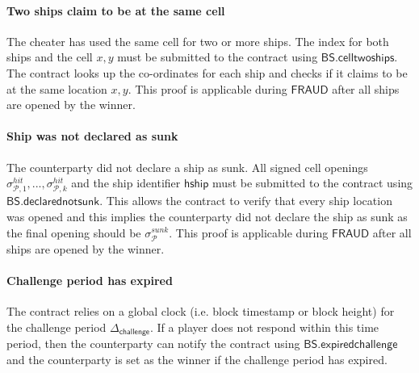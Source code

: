 \documentclass{llncs}
\newcommand{\gamefraud}{\mathsf{FRAUD}}
\newcommand{\hship}{\mathsf{hship}}
\newcommand{\participant}{\mathcal{P}}
\newcommand{\battleshipdeclarednotsunk}{\mathsf{BS.declarednotsunk}}
\newcommand{\battleshiptwoships}{\mathsf{BS.celltwoships}}
\newcommand{\battleshipchallengeexpired}{\mathsf{BS.expiredchallenge}}
\newcommand{\timerchallenge}{\mathsf{\Delta}_{\mathsf{challenge}}}
\begin{document}


\paragraph{Two ships claim to be at  the same cell} 
The cheater has used the same cell for two or more ships.  
The index for both ships and the cell $x,y$ must be submitted to the contract using $\battleshiptwoships$. 
The contract looks up the co-ordinates for each ship and checks if it claims to be at the same location $x, y$.
This proof is applicable during $\gamefraud$ after all ships are opened by the winner. 

\paragraph{Ship was not declared as sunk}
The counterparty did not declare a ship as sunk. 
All signed cell openings $\sigma^{hit}_{\participant,1},...,\sigma^{hit}_{\participant,k}$ and the ship identifier $\hship$ must be submitted to the contract using $\battleshipdeclarednotsunk$. 
This allows the contract to verify that every ship location was opened and this implies the counterparty did not declare the ship as sunk as the final opening should be $\sigma^{sunk}_{\participant}$. 
This proof is applicable during $\gamefraud$ after all ships are opened by the winner. 

\paragraph{Challenge period has expired }
The contract relies on a global clock (i.e. block timestamp or block height) for the challenge period  $\timerchallenge$. 
If a player does not respond within this time period, then the counterparty can notify the contract using $\battleshipchallengeexpired$ and the counterparty is set as the winner if the challenge period has expired. 
\end{document}
